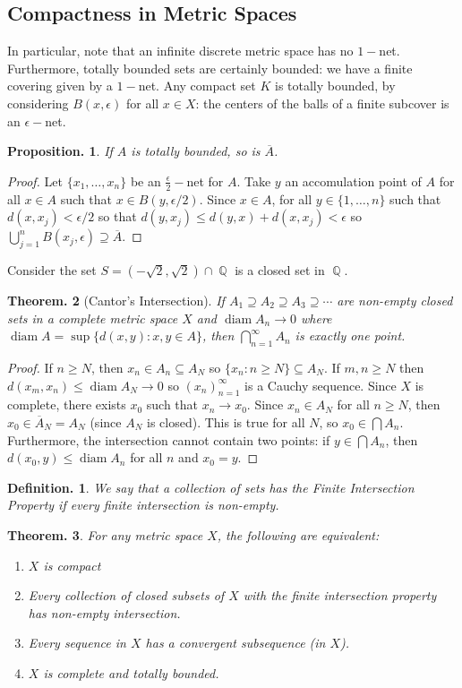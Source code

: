 \documentclass[11pt, a4paper]{memoir}
\DeclareMathOperator{\Q}{{\mathbb{Q}}}
\theoremstyle{change}
\newtheorem{theorem}{Theorem.}[section]
\newtheorem{proposition}[theorem]{Proposition.}
\theoremstyle{plain}
\theoremstyle{nonumberplain}
\newtheorem{definition}{Definition.}
\newtheorem{proof}{Proof}
\DeclareMathOperator{\diam}{diam}
\numberwithin{equation}{section}
\begin{document}
\subsection{Compactness in Metric Spaces}
In particular, note that an infinite discrete metric space has no $1-$net. Furthermore, totally bounded sets are certainly
bounded: we have a finite covering given by a $1-$net. Any compact set $K$ is totally bounded, by considering $B(x,\epsilon)$
for all $x\in X$: the centers of the balls of a finite subcover is an $\epsilon-$net.
\begin{proposition}
    If $A$ is totally bounded, so is $\overline{A}$.
\end{proposition}
\begin{proof}
    Let $\{x_1,\ldots,x_n\}$ be an $\frac{\epsilon}{2}-$net for $A$. Take $y$ an accomulation point of $A$ for all $x\in A$
    such that $x\in B(y,\epsilon/2)$. Since $x\in A$, for all $y\in\{1,\ldots,n\}$ such that $d(x,x_j)<\epsilon/2$
    so that $d(y,x_j)\leq d(y,x)+d(x,x_j)<\epsilon$ so $\bigcup_{j=1}^n B(x_j,\epsilon)\supseteq\overline{A}$.
\end{proof}
Consider the set $S=(-\sqrt{2},\sqrt{2})\cap\Q$ is a closed set in $\Q$.
\begin{theorem}[Cantor's Intersection]
    If $A_1\supseteq A_2\supseteq A_3\supseteq\cdots$ are non-empty closed sets in a complete metric space $X$ and $\diam A_n\to 0$
    where $\diam A=\sup\{d(x,y):x,y\in A\}$, then $\bigcap_{n=1}^\infty A_n$ is exactly one point.
\end{theorem}
\begin{proof}
    If $n\geq N$, then $x_n\in A_n\subseteq A_N$ so $\{x_n:n\geq N\}\subseteq A_N$. If $m,n\geq N$ then $d(x_m,x_n)\leq\diam A_N\to 0$
    so $(x_n)_{n=1}^\infty$ is a Cauchy sequence. Since $X$ is complete, there exists $x_0$ such that $x_n\to x_0$. Since
    $x_n\in A_N$ for all $n\geq N$, then $x_0\in\overline{A}_N=A_N$ (since $A_N$ is closed). This is true for all $N$, so
    $x_0\in \bigcap A_n$. Furthermore, the intersection cannot contain two points: if $y\in\bigcap A_n$, then $d(x_0,y)\leq\diam A_n$
    for all $n$ and $x_0=y$.
\end{proof}
\begin{definition}
    We say that a collection of sets has the Finite Intersection Property if every finite intersection is non-empty.
\end{definition}
\begin{theorem}
    For any metric space $X$, the following are equivalent:
    \begin{enumerate}
        \item $X$ is compact
        \item Every collection of closed subsets of $X$ with the finite intersection property has non-empty intersection.
        \item Every sequence in $X$ has a convergent subsequence (in $X$).
        \item $X$ is complete and totally bounded.
    \end{enumerate}
\end{theorem}
\end{document}
